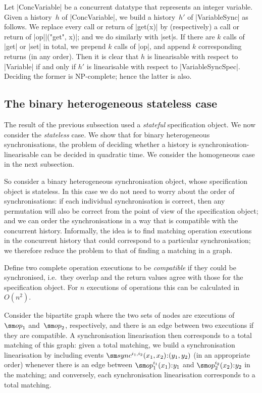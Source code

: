 Let |ConcVariable| be a concurrent datatype that represents an integer variable.
Given a history~$h$ of |ConcVariable|, we build a history~$h'$ of
|VariableSync| as follows.  We replace every call or return of |get(x)| by
(respectively) a call or return of |op||("get", x)|; and we do similarly
with |set|s.  If there are $k$ calls of |get| or |set| in total, we prepend
$k$ calls of |op|, and append $k$ corresponding returns (in any order).
%
Then it is clear that $h$ is linearisable with respect to |Variable| if and
only if $h'$ is linearisable with respect to |VariableSyncSpec|.  Deciding the
former is NP-complete; hence the latter is also. 


\subsection{The binary heterogeneous stateless case}
\label{sec:binary-heterogeneous}

The result of the previous subsection used a \emph{stateful} specification
object.  We now consider the \emph{stateless} case.  We show that for binary
heterogeneous synchronisations, the problem of deciding whether a history is
synchronisation-linearisable can be decided in quadratic time.  We consider
the homogeneous case in the next subsection.

So consider a binary heterogeneous synchronisation object, whose specification
object is stateless.  In this case we do not need to worry about the
order of synchronisations: if each individual synchronisation is correct, then
any permutation will also be correct from the point of view of the
specification object; and we can order the synchronisations in a way that is
compatible with the concurrent history.  Informally, the idea is to find
matching operation executions in the concurrent history that could correspond
to a particular synchronisation; we therefore reduce the problem to that of
finding a matching in a graph.

Define two complete operation executions to be \emph{compatible} if they could
be synchronised, i.e.~they overlap and the return values agree with those for
the specification object.  For $n$ executions of operations this can be
calculated in $O(n^2)$.

Consider the bipartite graph where the two sets of nodes are executions
of~$\op_1$ and~$\op_2$, respectively, and there is an edge between two
executions if they are compatible.  A synchronisation linearisation then
corresponds to a total matching of this graph: given a total matching, we
build a synchronisation linearisation by including events
$\sync^{i_1,i_2}(x_1,x_2)\::(y_1,y_2)$ (in an appropriate order) whenever
there is an edge between $\op_1^{i_1}(x_1)\::y_1$ and $\op_2^{i_2}(x_2)\::y_2$
in the matching; and conversely, each synchronisation linearisation
corresponds to a total matching.

